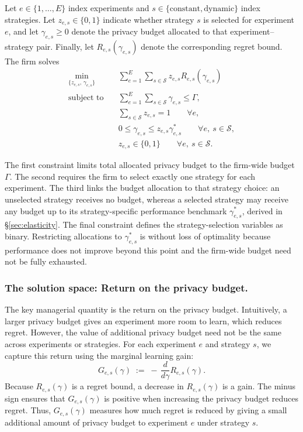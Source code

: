 \documentclass[mksc,nonblindrev]{informs3}
\begin{document}
Let $e\in\{1,\ldots,E\}$ index experiments and $s\in\{\mathrm{constant},\mathrm{dynamic}\}$ index strategies. Let $z_{e,s}\in\{0,1\}$ indicate whether strategy $s$ is selected for experiment $e$, and let $\gamma_{e,s}\geq0$ denote the privacy budget allocated to that experiment--strategy pair. Finally, let $R_{e,s}(\gamma_{e,s})$ denote the corresponding regret bound. The firm solves
\begin{equation}\label{eq:portfolio_with_explicit_strategy_choice}
\begin{aligned}
\min_{\{z_{e,s},\,\gamma_{e,s}\}}
\quad
& \sum_{e=1}^E\sum_{s\in\mathcal S}
z_{e,s}R_{e,s}(\gamma_{e,s})\\
\text{subject to}\quad
& \sum_{e=1}^E\sum_{s\in\mathcal S}\gamma_{e,s}\leq\Gamma,\\
& \sum_{s\in\mathcal S}z_{e,s}=1
\qquad \forall e,\\
& 0\leq\gamma_{e,s}\leq z_{e,s}\gamma_{e,s}^*
\qquad \forall e,\ s\in\mathcal S,\\
& z_{e,s}\in\{0,1\}
\qquad \forall e,\ s\in\mathcal S.
\end{aligned}
\end{equation}

The first constraint limits total allocated privacy budget to the firm-wide budget $\Gamma$. The second requires the firm to select exactly one strategy for each experiment. The third links the budget allocation to that strategy choice: an unselected strategy receives no budget, whereas a selected strategy may receive any budget up to its strategy-specific performance benchmark $\gamma_{e,s}^*$, derived in \S\ref{sec:elasticity}. The final constraint defines the strategy-selection variables as binary. Restricting allocations to $\gamma_{e,s}^*$ is without loss of optimality because performance does not improve beyond this point and the firm-wide budget need not be fully exhausted.

\subsubsection{The solution space: Return on the privacy budget.} 
The key managerial quantity is the return on the privacy budget. Intuitively, a larger privacy budget gives an experiment more room to learn, which reduces regret. However, the value of additional privacy budget need not be the same across experiments or strategies. For each experiment $e$ and strategy $s$, we capture this return using the marginal learning gain:
\begin{equation}\label{eq:Ge_def_portfolio}
G_{e,s}(\gamma)
\;:=\;
-\,\frac{d}{d\gamma}R_{e,s}(\gamma).
\end{equation}
Because $R_{e,s}(\gamma)$ is a regret bound, a decrease in $R_{e,s}(\gamma)$ is a gain. The minus sign ensures that $G_{e,s}(\gamma)$ is positive when increasing the privacy budget reduces regret. Thus, $G_{e,s}(\gamma)$ measures how much regret is reduced by giving a small additional amount of privacy budget to experiment $e$ under strategy $s$.
\end{document}
